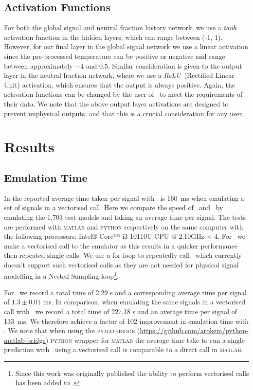 \subsection{Activation Functions}

For both the global signal and neutral fraction history network, we use a \textit{tanh} activation function in the hidden layers, which can range between (-1, 1). However, for our final layer in the global signal network we use a linear activation since the pre-processed temperature can be positive or negative and range between approximately $-4$ and $0.5$. Similar consideration is given to the output layer in the neutral fraction network, where we use a \textit{ReLU}~(Rectified Linear Unit) activation, which ensures that the output is always positive. Again, the activation functions can be changed by the user of \name~to meet the requirements of their data. We note that the above output layer activations are designed to prevent unphysical outputs, and that this is a crucial consideration for any user.

\section{Results}
\label{sec:globalemu_results}

\subsection{Emulation Time}
\label{timing}

In \cite{Cohen2020} the reported average time taken per signal with \cmGEM~is 160~ms when emulating a set of signals in a vectorised call. Here we compare the speed of \cmGEM~and \name~by emulating the 1,703 test models and taking an average time per signal. The tests are performed with \textsc{matlab} and \textsc{python} respectively on the same computer with the following processors: Intel® Core™ i3-10110U CPU @ 2.10GHz × 4. For \cmGEM~we make a vectorised call to the emulator as this results in a quicker performance then repeated single calls. We use a for loop to repeatedly call \name~which currently doesn't support such vectorised calls as they are not needed for physical signal modelling in a Nested Sampling loop\footnote{Since this work was originally published the ability to perform vectorised calls has been added to \name.}.

For \name~we record a total time of 2.29 s and a corresponding average time per signal of $1.3 \pm 0.01$ ms. In comparison, when emulating the same signals in a vectorised call with \cmGEM~we record a total time of 227.18 s and an average time per signal of 133~ms. We therefore achieve a factor of 102 improvement in emulation time with \name. We note that when using the \textsc{pymatbridge} (\url{https://github.com/arokem/python-matlab-bridge}) \textsc{python} wrapper for \textsc{matlab} the average time take to run a single prediction with \cmGEM~using a vectorised call is comparable to a direct call in \textsc{matlab}.

